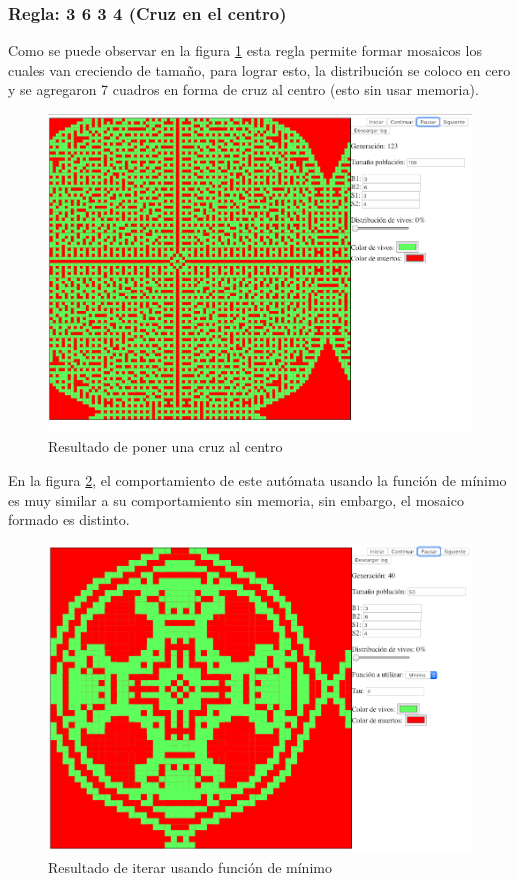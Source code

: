 	\subsubsection{Regla: 3 6 3 4 (Cruz en el centro)}
	Como se puede observar en la figura \ref{fig:golm8} esta regla permite formar mosaicos los cuales van creciendo de tamaño, para lograr esto, la distribución se coloco en cero y se agregaron 7 cuadros en forma de cruz al centro (esto sin usar memoria).
	\begin{figure}[H]
		\begin{center}
			\includegraphics[scale=.3]{GOLM/img/regla3634-0.png}
			\caption{Resultado de poner una cruz al centro}
			\label{fig:golm8}
		\end{center}
	\end{figure}

	En la figura \ref{fig:golm9}, el comportamiento de este autómata usando la función de mínimo es muy similar a su comportamiento sin memoria, sin embargo, el mosaico formado es distinto.
	\begin{figure}[H]
		\begin{center}
			\includegraphics[scale=.3]{GOLM/img/regla3634-1.png}
			\caption{Resultado de iterar usando función de mínimo}
			\label{fig:golm9}
		\end{center}
	\end{figure}

